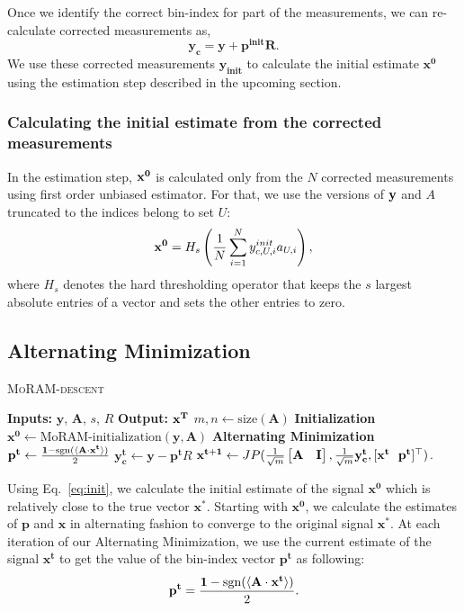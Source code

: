Once we identify the correct bin-index for part of the measurements, we can re-calculate corrected measurements as,
$$
\mathbf{y_{c} = y + p^{init}R}.
$$
We use these corrected measurements $\mathbf{y_{init}}$ to calculate the initial estimate $\mathbf{{x}^0}$ using the estimation step described in the upcoming section.
\subsubsection{Calculating the initial estimate from the corrected measurements}
In the estimation step, $\mathbf{x^0}$ is calculated only from the $N$ corrected measurements using first order unbiased estimator. For that, we use the versions of $\mathbf{y}$ and $A$ truncated to the indices belong to set $U$:
\begin{equation}
\mb{x^0} = H_s\left( \frac{1}{N}\sum_{i=1}^{N}y^{init}_{c,U,i}a_{U,i}\right),
\label{eq:init}
\end{equation}
where $H_s$ denotes the hard thresholding operator that keeps the $s$ largest absolute entries of a vector and sets the other entries to zero.
\subsection{Alternating Minimization}
\label{sec:altmin}
\begin{algorithm}[t]
	\caption{\textsc{MoRAM-descent}}
	\label{alg:MoRAM}
	\begin{algorithmic}
		\State\textbf{Inputs:} $\mathbf{y}$, $\mathbf{A}$, $s$, $R$
		\State\textbf{Output:}  $\mathbf{x^T}$
		\State $m,n \leftarrow \mathrm{size}(\mathbf{A})$ 
		\State \textbf{Initialization}
		\State $\mathbf{x^0} \leftarrow \textrm{MoRAM-initialization}(\mathbf{y, A})$ 
		\State \textbf{Alternating Minimization}
		\State $\mathbf{{p}^{t}} \leftarrow \frac{\mathbf{1}-\mathrm{sgn}(\langle \mathbf{A} \cdot \mathbf{x^t} \rangle)}{2}$
		\State $\mathbf{y^t_c} \leftarrow \mathbf{y} - \mathbf{p^t}R$
		\State $\mathbf{{x}^{t+1}}\leftarrow \small{JP(\frac{1}{\sqrt{m}}\begin{bmatrix} \mathbf{A} & \mathbf{I} \end{bmatrix},\frac{1}{\sqrt{m}}\mathbf{y^t_c},[\mathbf{x^t~~p^t}]^\t)}$.
		\EndFor
	\end{algorithmic}
\end{algorithm}

Using Eq.~\ref{eq:init}, we calculate the initial estimate of the signal $\mathbf{{x}^0}$ which is relatively close to the true vector $\mathbf{x^*}$. Starting with $\mathbf{{x}^0}$, we  calculate the estimates of $\mathbf{p}$ and $\mathbf{x}$ in alternating fashion to converge to the original signal $\mathbf{x^*}$. At each iteration of our Alternating Minimization, we use the current estimate of the signal ${\mathbf{x^t}}$ to get the value of the bin-index vector $\mathbf{{p}^t}$ as following:
\begin{equation}
\mathbf{{p}^{t}} = \frac{\mathbf{1}-\sgn(\langle \mathbf{A} \cdot \mathbf{x^t} \rangle)}{2}.
\label{step1}
\end{equation}


